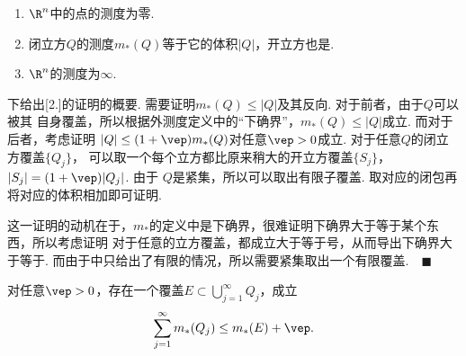   \begin{pos}
    $\,$
    \begin{enumerate}
      \item $\R^n$中的点的测度为零.
      \item 闭立方$Q$的测度$m_*(Q)$等于它的体积$|Q|$，开立方也是.
      \item $\R^n$的测度为$\infty$.
    \end{enumerate}
  \end{pos}
  \proof
    下给出[2.]的证明的概要. 需要证明$m_*(Q)\le|Q|$及其反向. 对于前者，由于$Q$可以被其
    自身覆盖，所以根据外测度定义中的“下确界”，$m_*(Q)\le|Q|$成立. 而对于后者，考虑证明
    $|Q|\le (1+\vep)m_*(Q)$对任意$\vep>0$成立. 对于任意$Q$的闭立方覆盖$\{Q_j\}$，
    可以取一个每个立方都比原来稍大的开立方覆盖$\{S_j\}$，$|S_j|=(1+\vep)|Q_j|$. 由于
    $Q$是紧集，所以可以取出有限子覆盖. 取对应的闭包再将对应的体积相加即可证明.\par
    这一证明的动机在于，$m_*$的定义中是下确界，很难证明下确界大于等于某个东西，所以考虑证明
    对于任意的立方覆盖，都成立大于等于号，从而导出下确界大于等于. 而由于中只给出了有限的情况，所以需要紧集取出一个有限覆盖.$\quad\blacksquare$

  \begin{lemma}
    对任意$\vep>0$，存在一个覆盖$E\subset\bigcup_{j=1}^\infty Q_j$，成立
    \[
      \sum_{j=1}^\infty m_*(Q_j) \le m_*(E)+\vep.
    \]
  \end{lemma}

